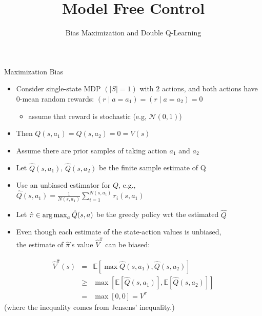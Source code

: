 \documentclass[aspectratio=169]{../latex_main/tntbeamer}  %
\title[RL: Model Free Control]{Model Free Control}
\subtitle{Bias Maximization and Double Q-Learning}
\begin{document}
	
	\maketitle

\begin{frame}[c]{Maximization Bias}
	\vspace{-1.3em}
	\begin{itemize}
		\item Consider single-state MDP $(|S| = 1)$ with $2$ actions, and both actions have 0-mean random rewards: $(r \mid a = a_1 ) = (r \mid a = a_2) = 0$
		\begin{itemize}
				\item assume that reward is stochastic (e.g, $\mathcal{N}(0,1)$)
		\end{itemize}
		\item Then $Q(s,a_1) = Q(s,a_2) = 0 = V(s)$
		\item Assume there are prior samples of taking action $a_1$ and $a_2$
		\pause
		\item Let $\hat{Q}(s,a_1)$, $\hat{Q}(s,a_2)$ be the \alert{finite} sample estimate of Q
		\item Use an unbiased estimator for $Q$, e.g., $\hat{Q}(s,a_1) = \frac{1}{N(s,a_1)} \sum_{i=1}^{N(s,a_1)} r_i(s,a_1)$
		\pause
		\item Let $\hat{\pi}\in \operatorname*{arg\,max}_{a}\hat{Q}(s,a)$ be the greedy policy wrt the estimated $\hat{Q}$
		\pause
		\item Even though each estimate of the state-action values is unbiased,\\ the estimate of $\hat{\pi}$'s value $\hat{V}^{\hat{\pi}}$ can be biased:
	\end{itemize}

\vspace{-1em}
\begin{eqnarray}
\hat{V}^{\hat{\pi}}(s) &=& \mathbb{E} [\max \hat{Q}(s,a_1), \hat{Q}(s,a_2)]\nonumber\\
&\geq& \max [\mathbb{E}[\hat{Q}(s,a_1)],\mathbb{E}[\hat{Q}(s,a_2)]]\nonumber\\
&=& \max[0,0] = V^\pi\nonumber
\end{eqnarray}
(where the inequality comes from Jensens' inequality.)
	
\end{frame}
\end{document}
